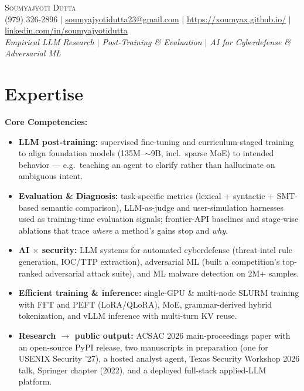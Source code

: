 \documentclass[letterpaper,11pt]{article}
\begin{document}
\begin{center}
    {\Huge \scshape Soumyajyoti Dutta} \\ \vspace{2pt}
    \small (979) 326-2896 $|$
    \href{mailto:soumyajyotidutta23@gmail.com}{\underline{soumyajyotidutta23@gmail.com}} $|$
    \href{https://xoumyax.github.io/}{\underline{https://xoumyax.github.io/}} $|$
    \href{https://www.linkedin.com/in/soumyajyotidutta/}{\underline{linkedin.com/in/soumyajyotidutta}}
    \\ \vspace{2pt}
    \small \textit{Empirical LLM Research $|$ Post-Training \& Evaluation $|$ AI for Cyberdefense \& Adversarial ML}
\end{center}

\section{Expertise}

\textbf{Core Competencies:}
\begin{itemize}[leftmargin=0.15in, itemsep=-3pt, topsep=1pt]
  \small
  \item \textbf{LLM post-training:} supervised fine-tuning and curriculum-staged training to align foundation models (135M--$\sim$9B, incl.\ sparse MoE) to intended behavior --- e.g.\ teaching an agent to clarify rather than hallucinate on ambiguous intent.
  \item \textbf{Evaluation \& Diagnosis:} task-specific metrics (lexical + syntactic + SMT-based semantic comparison), LLM-as-judge and user-simulation harnesses used as training-time evaluation signals; frontier-API baselines and stage-wise ablations that trace \textit{where} a method's gains stop and \textit{why}.
  \item \textbf{AI $\times$ security:} LLM systems for automated cyberdefense (threat-intel rule generation, IOC/TTP extraction), adversarial ML (built a competition's top-ranked adversarial attack suite), and ML malware detection on 2M+ samples.
  \item \textbf{Efficient training \& inference:} single-GPU \& multi-node SLURM training with FFT and PEFT (LoRA/QLoRA), MoE, grammar-derived hybrid tokenization, and vLLM inference with multi-turn KV reuse.
  \item \textbf{Research $\rightarrow$ public output:} ACSAC 2026 main-proceedings paper with an open-source PyPI release, two manuscripts in preparation (one for USENIX Security '27), a hosted analyst agent, Texas Security Workshop 2026 talk, Springer chapter (2022), and a deployed full-stack applied-LLM platform.
\end{itemize}
\end{document}
